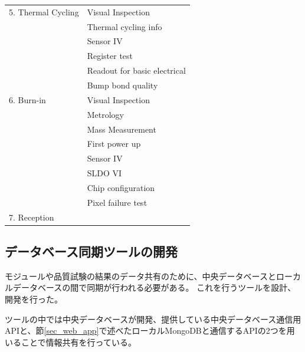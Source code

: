 \begin{table}[btp]
\begin{center}
\begin{tabular}{|ll|}
    5. Thermal Cycling      & Visual Inspection \\ 
                            & Thermal cycling info \\
                            & Sensor IV \\
                            & Register test\\
                            & Readout for basic electrical \\
                            & Bump bond quality \\\hline

    6. Burn-in              & Visual Inspection \\ 
                            & Metrology \\
                            & Mass Measurement \\
                            & First power up\\
                            & Sensor IV\\
                            & SLDO VI\\
                            & Chip configuration\\
                            & Pixel failure test\\\hline

    7. Reception            & \\\hline 
  \end{tabular}
\end{center}
\end{table}


\clearpage

\subsection{データベース同期ツールの開発} \label{sec:interfacing_tool}
モジュールや品質試験の結果のデータ共有のために、中央データベースとローカルデータベースの間で同期が行われる必要がある。
これを行うツールを設計、開発を行った。

ツールの中では中央データベースが開発、提供している中央データベース通信用APIと、節\ref{sec_web_app}で述べたローカルMongoDBと通信するAPIの2つを用いることで情報共有を行っている。

